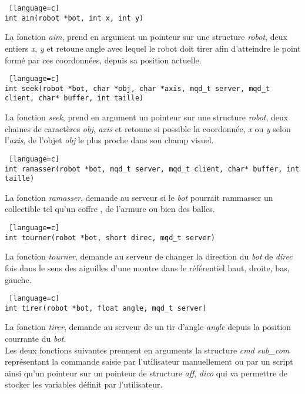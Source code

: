 \documentclass[a4paper, 11pt]{article}
\begin{document}
\begin {lstlisting} [language=c]
int aim(robot *bot, int x, int y)
\end{lstlisting}
La fonction \emph{aim}, prend en argument un pointeur sur une structure \emph{robot}, deux entiers \emph{x}, \emph{y} et retoune angle avec lequel le robot doit tirer afin d'atteindre le point formé par ces coordonnées, depuis sa position actuelle.\\

\begin {lstlisting} [language=c]
int seek(robot *bot, char *obj, char *axis, mqd_t server, mqd_t client, char* buffer, int taille)
\end{lstlisting}
La fonction \emph{seek}, prend en argument un pointeur sur une structure \emph{robot}, deux chaines de caractères \emph{obj}, \emph{axis} et retoune si possible la coordonnée, \emph{x} ou \emph{y} selon l'\emph{axis}, de l'objet \emph{obj} le plus proche dans son champ visuel.\\

\begin {lstlisting} [language=c]
int ramasser(robot *bot, mqd_t server, mqd_t client, char* buffer, int taille)
\end{lstlisting}
La fonction \emph{ramasser}, demande au serveur si le \emph{bot} pourrait rammasser un collectible tel qu'un coffre , de l'armure ou bien des balles.\\

\begin {lstlisting} [language=c]
int tourner(robot *bot, short direc, mqd_t server)
\end{lstlisting}
La fonction \emph{tourner}, demande au serveur de changer la direction du \emph{bot} de \emph{direc} fois dans le sens des aiguilles d'une montre dans le référentiel haut, droite, bas, gauche.\\

\begin {lstlisting} [language=c]
int tirer(robot *bot, float angle, mqd_t server)
\end{lstlisting}
La fonction \emph{tirer}, demande au serveur de un tir d'angle \emph{angle} depuis la position courrante du  \emph{bot}.\\

Les deux fonctions suivantes prennent en arguments la structure \emph{cmd sub\_com} représentant la commande saisie par l'utilisateur manuellement ou par un script ainsi qu'un pointeur sur un pointeur de structure \emph{aff}, \emph{dico} qui va permettre de stocker les variables définit par l'utilisateur.\\
\end{document}
